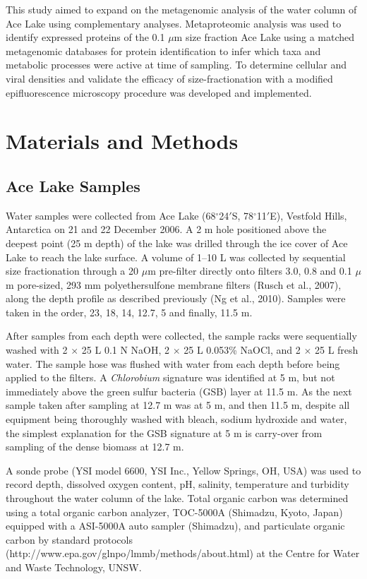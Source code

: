 This study aimed to expand on the metagenomic analysis of the water column of Ace Lake using complementary analyses.
Metaproteomic analysis was used to identify expressed proteins of the 0.1 $\mu$m size fraction Ace Lake using a matched metagenomic databases for protein identification to infer which taxa and metabolic processes were active at time of sampling.
To determine cellular and viral densities and validate the efficacy of size-fractionation with a modified epifluorescence microscopy procedure was developed and implemented.


\section{Materials and Methods}
\subsection{Ace Lake Samples}
Water samples were collected from Ace Lake (68$^{\circ}$24$'$S, 78$^{\circ}$11$'$E), Vestfold Hills, Antarctica on 21 and 22 December 2006. 
A 2 m hole positioned above the deepest point (25 m depth) of the lake was drilled through the ice cover of Ace Lake to reach the lake surface.
A volume of 1--10 L was collected by sequential size fractionation through a 20 $\mu$m pre-filter directly onto filters 3.0, 0.8 and 0.1 $\mu$m pore-sized, 293 mm polyethersulfone membrane filters (Rusch et al., 2007), along the depth profile as described previously (Ng et al., 2010).
Samples were taken in the order, 23, 18, 14, 12.7, 5 and finally, 11.5 m.

After samples from each depth were collected, the sample racks were sequentially washed with 2 $\times$ 25 L 0.1 N NaOH, 2 $\times$ 25 L 0.053\% NaOCl, and 2 $\times$ 25 L fresh water. 
The sample hose was flushed with water from each depth before being applied to the filters. 
A \emph{Chlorobium} signature was identified at 5 m, but not immediately above the green sulfur bacteria (GSB) layer at 11.5 m. 
As the next sample taken after sampling at 12.7 m was at 5 m, and then 11.5 m, despite all equipment being thoroughly washed with bleach, sodium hydroxide and water, 
the simplest explanation for the GSB signature at 5 m is carry-over from sampling of the dense biomass at 12.7 m. 

A sonde probe (YSI model 6600, YSI Inc., Yellow Springs, OH, USA) was used to record depth, dissolved oxygen content, pH, salinity, temperature and turbidity throughout the water column of the lake. 
Total organic carbon was determined using a total organic carbon analyzer, TOC-5000A (Shimadzu, Kyoto, Japan) equipped with a ASI-5000A auto sampler (Shimadzu), and particulate organic carbon by standard protocols \\
(http://www.epa.gov/glnpo/lmmb/methods/about.html) 
at the Centre for Water and Waste Technology, UNSW.

